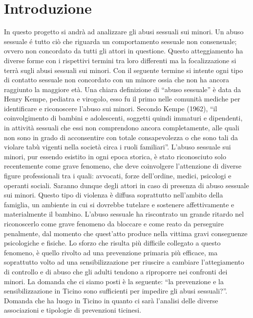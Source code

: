 \section{Introduzione}
In questo progetto si andrà ad analizzare gli abusi sessuali sui minori. Un abuso sessuale é tutto ciò che riguarda un comportamento sessuale non consensuale; ovvero non concordato da tutti gli attori in questione. Questo atteggiamento ha diverse forme con i rispettivi termini tra loro differenti ma la focalizzazione si terrà sugli abusi sessuali sui minori. 
Con il seguente termine si intente ogni tipo di contatto sessuale non concordato con un minore ossia che non ha ancora raggiunto la maggiore età. Una chiara definizione di “abuso sessuale” è data da Henry Kempe, pediatra e virogolo, esso fu il primo nelle comunità mediche per identificare e riconoscere l’abuso sui minori. Secondo Kempe (1962), “il coinvolgimento di bambini e adolescenti, soggetti quindi immaturi e dipendenti, in attività sessuali che essi non comprendono ancora completamente, alle quali non sono in grado di acconsentire con totale consapevolezza o che sono tali da violare tabù vigenti nella società circa i ruoli familiari”.
L’abuso sessuale sui minori, pur essendo esistito in ogni epoca storica, è stato riconosciuto solo recentemente come grave fenomeno, che deve coinvolgere l’attenzione di diverse figure professionali tra i quali: avvocati, forze dell’ordine, medici, psicologi e operanti sociali. Saranno dunque degli attori in caso di presenza di abuso sessuale sui minori. Questo tipo di violenza è diffusa soprattutto nell’ambito della famiglia, un ambiente in cui si dovrebbe tutelare e sostenere affettivamente e materialmente il bambino. L’abuso sessuale ha riscontrato un grande ritardo nel riconoscerlo come grave fenomeno da bloccare e come reato da perseguire penalmente, dal momento che quest’atto produce nella vittima gravi conseguenze psicologiche e fisiche. 
Lo sforzo che risulta più difficile collegato a questo fenomeno, è quello rivolto ad una prevenzione primaria più efficace, ma soprattutto volto ad una sensibilizzazione per riuscire a cambiare l’attegiamento di controllo e di abuso che gli adulti tendono a riproporre nei confronti dei minori.
La domanda che ci siamo posti è la seguente: “la prevenzione e la sensibilizzazione in Ticino sono sufficienti per impedire gli abusi sessuali?”.
Domanda che ha luogo in Ticino in quanto ci sarà l’analisi delle diverse associazioni e tipologie di prevenzioni ticinesi.
